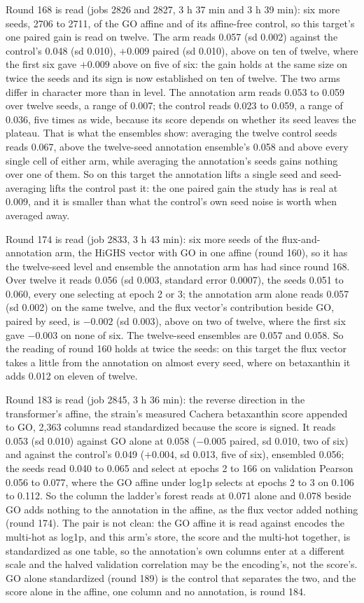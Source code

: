 Round 168 is read (jobs 2826 and 2827, 3 h 37 min and 3 h 39 min): six more seeds,
2706 to 2711, of the GO affine and of its affine-free control, so this target's one
paired gain is read on twelve. The arm reads 0.057 (sd 0.002) against the control's
0.048 (sd 0.010), $+0.009$ paired (sd 0.010), above on ten of twelve, where the first
six gave $+0.009$ above on five of six: the gain holds at the same size on twice the
seeds and its sign is now established on ten of twelve. The two arms differ in
character more than in level. The annotation arm reads 0.053 to 0.059 over twelve
seeds, a range of 0.007; the control reads 0.023 to 0.059, a range of 0.036, five
times as wide, because its score depends on whether its seed leaves the plateau. That
is what the ensembles show: averaging the twelve control seeds reads 0.067, above the
twelve-seed annotation ensemble's 0.058 and above every single cell of either arm,
while averaging the annotation's seeds gains nothing over one of them. So on this
target the annotation lifts a single seed and seed-averaging lifts the control past
it: the one paired gain the study has is real at 0.009, and it is smaller than what
the control's own seed noise is worth when averaged away.

Round 174 is read (job 2833, 3 h 43 min): six more seeds of the flux-and-annotation
arm, the HiGHS vector with GO in one affine (round 160), so it has the twelve-seed level
and ensemble the annotation arm has had since round 168. Over twelve it reads 0.056
(sd 0.003, standard error 0.0007), the seeds 0.051 to 0.060, every one selecting at
epoch 2 or 3; the annotation arm alone reads 0.057 (sd 0.002) on the same twelve, and
the flux vector's contribution beside GO, paired by seed, is $-0.002$ (sd 0.003), above
on two of twelve, where the first six gave $-0.003$ on none of six. The twelve-seed
ensembles are 0.057 and 0.058. So the reading of round 160 holds at twice the seeds: on
this target the flux vector takes a little from the annotation on almost every seed,
where on betaxanthin it adds 0.012 on eleven of twelve.

Round 183 is read (job 2845, 3 h 36 min): the reverse direction in the transformer's
affine, the strain's measured Cachera betaxanthin score appended to GO, 2,363 columns
read standardized because the score is signed. It reads 0.053 (sd 0.010) against GO
alone at 0.058 ($-0.005$ paired, sd 0.010, two of six) and against the control's 0.049
($+0.004$, sd 0.013, five of six), ensembled 0.056; the seeds read 0.040 to 0.065 and
select at epochs 2 to 166 on validation Pearson 0.056 to 0.077, where the GO affine
under log1p selects at epochs 2 to 3 on 0.106 to 0.112. So the column the ladder's
forest reads at 0.071 alone and 0.078 beside GO adds nothing to the annotation in the
affine, as the flux vector added nothing (round 174). The pair is not clean: the GO
affine it is read against encodes the multi-hot as log1p, and this arm's store, the
score and the multi-hot together, is standardized as one table, so the annotation's
own columns enter at a different scale and the halved validation correlation may be the
encoding's, not the score's. GO alone standardized (round 189) is the control that
separates the two, and the score alone in the affine, one column and no annotation, is
round 184.


